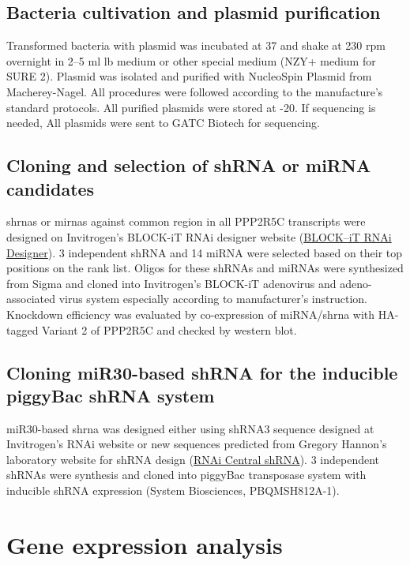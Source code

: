 \subsection{Bacteria cultivation and plasmid purification}
Transformed bacteria with plasmid was incubated at 37{\celsius} and shake at 230 rpm overnight in 2--5 ml \gls{lb} medium or other special medium (NZY+ medium for SURE 2). Plasmid was isolated and purified with NucleoSpin\textsuperscript{\textregistered} Plasmid from Macherey-Nagel. All procedures were followed according to the manufacture's standard protocols. All purified plasmids were stored at -20{\celsius}. If sequencing is needed, All plasmids were sent to GATC Biotech for sequencing.

\subsection{Cloning and selection of shRNA or miRNA candidates}

\gls{shrna}s or \gls{mirna}s against common region in all PPP2R5C transcripts were designed on Invitrogen's BLOCK-iT\textsuperscript{\texttrademark} RNAi designer website (\href{http://rnaidesigner.lifetechnologies.com/rnaiexpress/}{BLOCK--iT\textsuperscript{\texttrademark} RNAi Designer}). 3 independent shRNA and 14 miRNA were selected based on their top positions on the rank list. Oligos for these shRNAs and miRNAs were synthesized from Sigma and cloned into Invitrogen's BLOCK-iT\textsuperscript{\texttrademark} adenovirus and adeno-associated virus system especially according to manufacturer's instruction. Knockdown efficiency was evaluated by co-expression of miRNA/\gls{shrna} with HA-tagged Variant 2 of PPP2R5C and checked by western blot.

\subsection{Cloning miR30-based shRNA for the inducible piggyBac shRNA system}

miR30-based \gls{shrna} was designed either using shRNA3 sequence designed at Invitrogen's RNAi website or new sequences predicted from Gregory Hannon's laboratory website for shRNA design (\href{http://cancan.cshl.edu/RNAi_central/RNAi.cgi?type=shRNA}{RNAi Central shRNA}). 3 independent shRNAs were synthesis and cloned into piggyBac transposase system with inducible shRNA expression (System Biosciences, PBQMSH812A-1). 

\section{Gene expression analysis}


